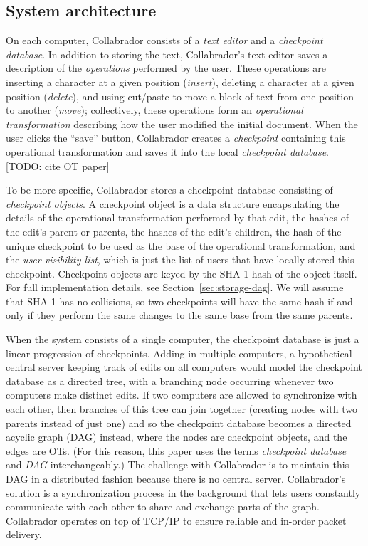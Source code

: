\documentclass[11pt,titlepage]{article}
\begin{document}
\subsection{System architecture}

On each computer, Collabrador consists of a \emph{text editor} and a
\emph{checkpoint database}. In addition to storing the text,
Collabrador's text editor saves a description of the
\emph{operations} performed by the user. These operations are
inserting a character at a given position (\emph{insert}), deleting
a character at a given position (\emph{delete}), and using cut/paste
to move a block of text from one position to another (\emph{move});
collectively, these operations form an \emph{operational
  transformation} describing how the user modified the initial
document. When the user clicks the ``save'' button, Collabrador
creates a \emph{checkpoint} containing this operational
transformation and saves it into the local \emph{checkpoint
  database}. [TODO: cite OT paper]

To be more specific, Collabrador stores a checkpoint database
consisting of \emph{checkpoint objects}. A checkpoint object is a data structure
encapsulating the details of the operational transformation performed
by that edit, the hashes of the edit's parent or parents, the hashes
of the edit's children, the hash of the unique checkpoint to be used
as the base of the operational transformation, and the \emph{user
  visibility list}, which is just the list of users that have locally
stored this checkpoint. Checkpoint objects are keyed by the SHA-1 hash of
the object itself. For full implementation details, see
Section~\ref{sec:storage-dag}.  We will assume that SHA-1 has no collisions,
so two checkpoints will have the same hash if and only if they perform
the same changes to the same base from the same parents.

When the system consists of a single computer, the checkpoint database
is just a linear progression of checkpoints. Adding in multiple
computers, a hypothetical central server keeping track of edits on all
computers would model the checkpoint database as a directed tree, with
a branching node occurring whenever two computers make distinct
edits. If two computers are allowed to synchronize with each other,
then branches of this tree can join together (creating nodes with two
parents instead of just one) and so the checkpoint database becomes a
directed acyclic graph (DAG) instead, where the nodes are checkpoint objects,
and the edges are OTs.  (For this reason, this paper
uses the terms \emph{checkpoint database} and \emph{DAG}
interchangeably.)  The challenge with Collabrador is to maintain this
DAG in a distributed fashion because there is no central
server. Collabrador's solution is %
a synchronization process in the background that lets users
constantly communicate with each other to share and exchange parts of
the graph. Collabrador operates on top of TCP/IP to ensure reliable and
in-order packet delivery.
\end{document}
